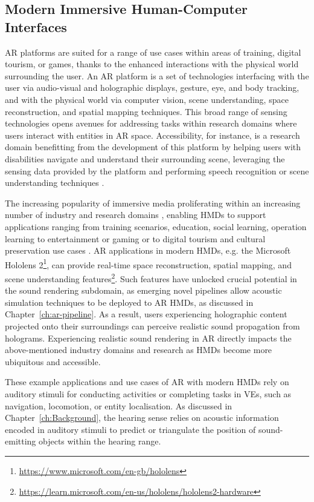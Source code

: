 \subsection{Modern Immersive Human-Computer Interfaces}
AR platforms are suited for a range of use cases within areas of training, digital tourism, or games, thanks to the enhanced interactions with the physical world surrounding the user. An AR platform is a set of technologies interfacing with the user via audio-visual and holographic displays, gesture, eye, and body tracking, and with the physical world via computer vision, scene understanding, space reconstruction, and spatial mapping techniques. This broad range of sensing technologies opens avenues for addressing tasks within research domains where users interact with entities in AR space. Accessibility, for instance, is a research domain benefitting from the development of this platform by helping users with disabilities navigate and understand their surrounding scene, leveraging the sensing data provided by the platform and performing speech recognition or scene understanding techniques \citep{mehra2020potential}.\par
The increasing popularity of immersive media proliferating within an increasing number of industry and research domains \citep{park2022metaverse}, enabling HMDs to support applications ranging from training scenarios, education, social learning, operation learning \citep{harris2020effect, ahir2020application} to entertainment or gaming \citep{yuen2011augmented, ke2018virtual} or to digital tourism and cultural preservation use cases \citep{schofield2018viking, selmanovic2020cultural}. AR applications in modern HMDs, e.g. the Microsoft Hololens 2\footnote{\url{https://www.microsoft.com/en-gb/hololens}\label{note:ms-hl2}}, can provide real-time space reconstruction, spatial mapping, and scene understanding features\footnote{\url{https://learn.microsoft.com/en-us/hololens/hololens2-hardware}\label{note:ms-hl2-hw}}. Such features have unlocked crucial potential in the sound rendering subdomain, as emerging novel pipelines allow acoustic simulation techniques to be deployed to AR HMDs, as discussed in Chapter~\ref{ch:ar-pipeline}. As a result, users experiencing holographic content projected onto their surroundings can perceive realistic sound propagation from holograms. Experiencing realistic sound rendering in AR directly impacts the above-mentioned industry domains and research as HMDs become more ubiquitous and accessible.\par
These example applications and use cases of AR with modern HMDs rely on auditory stimuli for conducting activities or completing tasks in VEs, such as navigation, locomotion, or entity localisation. As discussed in Chapter~\ref{ch:Background}, the hearing sense relies on acoustic information encoded in auditory stimuli to predict or triangulate the position of sound-emitting objects within the hearing range.


